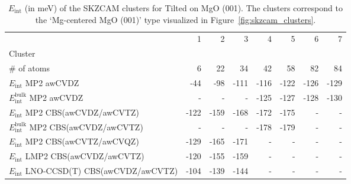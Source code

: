 \begin{table}
\caption{\label{tab:system_eint_mgo_n2o_tilted}$E_\textrm{int}$ (in meV) of the SKZCAM clusters for Tilted  on MgO (001). The clusters correspond to the `Mg-centered MgO (001)' type visualized in Figure~\ref{fig:skzcam_clusters}.}
\begin{adjustbox}{center,max width=1.4\textwidth}
\begin{tabular}{lrrrrrrr}
\toprule
 & 1 & 2 & 3 & 4 & 5 & 6 & 7 \\ 
Cluster &  &  &  &  &  &  &  \\
\midrule
\# of atoms & 6 & 22 & 34 & 42 & 58 & 82 & 84 \\
$E_\textrm{int}$ MP2 awCVDZ & -44 & -98 & -111 & -116 & -122 & -126 & -129 \\
$E_\textrm{int}^\textrm{bulk}$ MP2 awCVDZ & - & - & - & -125 & -127 & -128 & -130 \\
$E_\textrm{int}$ MP2 CBS(awCVDZ/awCVTZ) & -122 & -159 & -168 & -172 & -175 & - & - \\
$E_\textrm{int}^\textrm{bulk}$ MP2 CBS(awCVDZ/awCVTZ) & - & - & - & -178 & -179 & - & - \\
$E_\textrm{int}$ MP2 CBS(awCVTZ/awCVQZ) & -129 & -165 & -171 & - & - & - & - \\
$E_\textrm{int}$ LMP2 CBS(awCVDZ/awCVTZ) & -120 & -155 & -159 & - & - & - & - \\
$E_\textrm{int}$ LNO-CCSD(T) CBS(awCVDZ/awCVTZ) & -104 & -139 & -144 & - & - & - & - \\
\bottomrule
\end{tabular}
\end{adjustbox}
\end{table}

